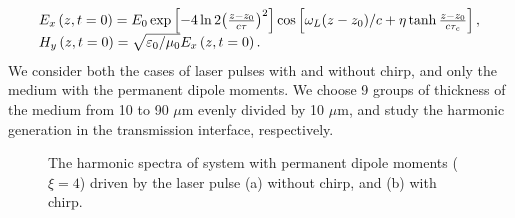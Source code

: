 \documentclass[10pt,letterpaper]{article}
\begin{document}
\begin{equation}
\begin{array}{l}
{E_x}\left( {z,t = 0} \right) = {E_0}\exp \left[ { - 4\ln 2{{\left( {\frac{{z - {z_0}}}{{c\tau }}} \right)}^2}} \right]\cos \left[ {{\omega _L}{{\left( {z - {z_0}} \right)} \mathord{\left/
			{\vphantom {{\left( {z - {z_0}} \right)} c}} \right.
			\kern-\nulldelimiterspace} c} + \eta \tanh \frac{{z - {z_0}}}{{c{\tau _c}}}} \right],\\
{H_y}\left( {z,t = 0} \right) = \sqrt {{{{\varepsilon _0}} \mathord{\left/
			{\vphantom {{{\varepsilon _0}} {{\mu _0}}}} \right.
			\kern-\nulldelimiterspace} {{\mu _0}}}} {E_x}\left( {z,t = 0} \right).
\end{array}
\label{eq20}
\end{equation} 
We consider both the cases of laser pulses with and without chirp, and only the medium with the permanent dipole moments. We choose 9 groups of thickness of the medium from 10 to 90 $ \mu $m evenly divided by 10 $ \mu $m, and study the harmonic generation in the transmission interface, respectively. 

\begin{figure}[!htbp]
\centering
{}
\caption{The harmonic spectra of system with permanent dipole moments ($ \xi=4 $) driven by the laser pulse (a) without chirp, and (b) with chirp.}
\label{fig6}
\end{figure}
\end{document}
